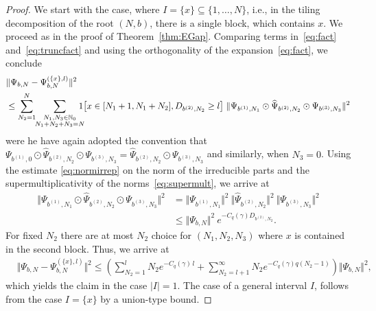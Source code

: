 \documentclass[letterpaper, DIV=17]{scrartcl}
\numberwithin{equation}{section}
\theoremstyle{definition}
\begin{document}
\begin{proof}
	We start with the case, where $I =\{x\}\subseteq \{1, \dots, N\}$, i.e., in the tiling decomposition of the root $(N,b) $,  there is a single block, which contains $x$. 
	We proceed as in the proof of Theorem~\ref{thm:EGap}. Comparing terms in~\eqref{eq:fact} and~\eqref{eq:truncfact} and using the orthogonality of the expansion~\eqref{eq:fact}, we conclude
	\begin{align*}
		&\Vert \Psi_{b,N}-\Psi_{b,N}^{(\{x\},l)} \Vert^2 \\
		&\leq \sum_{N_2=1}^N \mkern-5mu \sum_{\substack{N_1, N_3\in \mathbb{N}_0 \\ N_1+N_2+N_3=N}} \mkern-15mu 1\big[x\in [N_1+1, N_1+N_2], D_{b^{(2)}, N_2}\geq l \big] \;  \Vert \Psi_{b^{(1)},N_1} \odot \widehat{\Psi}_{b^{(2)}, N_2} \odot \Psi_{b^{(3)},N_3} \Vert^2 
	\end{align*}
	were he have again adopted the convention that $ \Psi_{b^{(1)},0} \odot \widehat{\Psi}_{b^{(2)}, N_2} \odot \Psi_{b^{(3)},N_3} =  \widehat{\Psi}_{b^{(2)}, N_2} \odot \Psi_{b^{(3)},N_3}$ and similarly, when $N_3=0$. 
	Using the estimate \eqref{eq:normirrep}  on the norm of the irreducible parts and the supermultiplicativity of the norms~\eqref{eq:supermult}, we arrive at
	\begin{align*}
		\Vert \Psi_{b^{(1)},N_1} \odot \widehat{\Psi}_{b^{(2)}, N_2} \odot \Psi_{b^{(3)},N_3} \Vert^2 & = \Vert \Psi_{b^{(1)},N_1} \Vert^2 \ \Vert  \widehat{\Psi}_{b^{(2)}, N_2} \Vert^2 \ \Vert \Psi_{b^{(3)},N_3} \Vert^2 \\
		& \leq \Vert \Psi_{b,N}\Vert^2 \ e^{-C_q(\gamma)D_{b^{(2)}, N_2}} .
	\end{align*}
	For fixed $N_2$ there are at most $N_2$ choice for $(N_1, N_2, N_3)$ where $x$ is contained in the second block. Thus, we arrive at 
	\begin{align*}
		&\Vert \Psi_{b,N}-\Psi_{b,N}^{(\{x\},l)} \Vert^2
		\leq \left( \sum_{N_2=1}^{l} N_2 e^{-C_q(\gamma) \, l} + \sum_{N_2=l+1}^{\infty} N_2 e^{-C_q(\gamma) q (N_2-1)}\right) \Vert \Psi_{b,N}\Vert^2,
	\end{align*}
	which yields the claim in the case $|I| =1$. The case of a general interval $I$, follows from the case $I =\{x\} $ by a union-type bound.
\end{proof}
\end{document}
